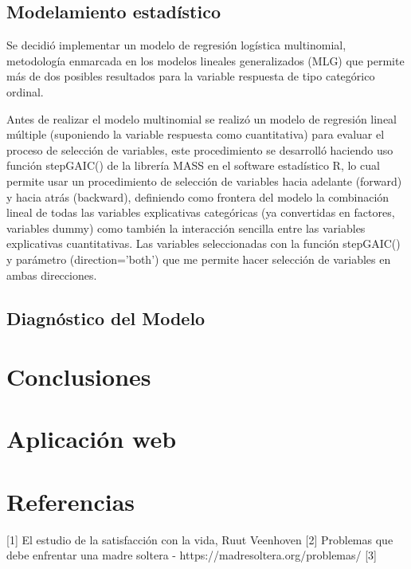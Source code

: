 \documentclass[11pt,twoside]{article}
\begin{document}
\subsection{Modelamiento estadístico}

Se decidió implementar un modelo de regresión logística multinomial, metodología enmarcada en los modelos lineales generalizados (MLG) que permite más de dos posibles resultados para la variable respuesta de tipo categórico ordinal. 



Antes de realizar el modelo multinomial se realizó un modelo de regresión lineal múltiple (suponiendo la variable respuesta como cuantitativa) para evaluar el proceso de selección de variables, este procedimiento se desarrolló haciendo uso función stepGAIC() de la librería MASS en el software estadístico R, lo cual permite usar un procedimiento de selección de variables hacia adelante (forward) y hacia atrás (backward), definiendo como frontera del modelo la combinación lineal de todas las variables explicativas categóricas (ya convertidas en factores, variables dummy) como también la interacción sencilla entre las variables explicativas cuantitativas.
Las variables seleccionadas con la función stepGAIC() y parámetro (direction=’both’) que me permite hacer selección de variables en ambas direcciones.





\subsection{Diagnóstico del Modelo}








\section{Conclusiones}







\section{Aplicación web}






\section{Referencias}
[1] El estudio de la satisfacción con la vida, Ruut Veenhoven 
[2] Problemas que debe enfrentar una madre soltera - https://madresoltera.org/problemas/
[3] 
\end{document}
